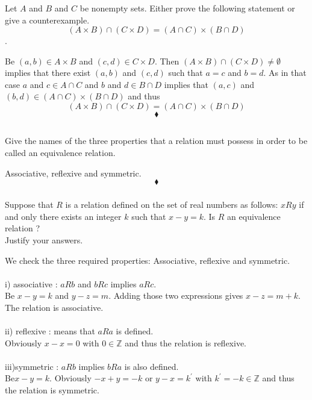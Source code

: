 \subsubsection{}
\begin{tcolorbox}
Let $A$ and $B$ and $C$ be nonempty sets. Either prove the following statement or give a counterexample. $$(A\times  B) \cap (C\times D) = (A\cap C) \times (B \cap D)$$.
\end{tcolorbox}
$$ $$
Be $(a,b)\in A\times B$ and $(c,d)\in C\times D$. Then $(A\times  B) \cap (C\times D)\neq \emptyset$ implies that there exist $(a,b)$ and $(c,d)$ such that $a=c$ and $b=d$. As in that case $a$ and $c\in A\cap C$ and  $b$ and $d\in B\cap D$ implies that $(a,c)$ and $(b,d) \in (A\cap C) \times (B \cap D)$ and thus 
$$(A\times  B) \cap (C\times D) = (A\cap C) \times (B \cap D)$$
$$\blacklozenge$$


\renewcommand{\thesubsection}{\thesection.\RomanNumeralCaps{3}}
\subsection{}
\subsubsection{}
\begin{tcolorbox}
Give the names of the three properties that a relation must possess in order to be called an equivalence relation.
\end{tcolorbox}
$$ $$
Associative, reflexive and symmetric.
$$\blacklozenge$$

\subsubsection{}
\begin{tcolorbox}
Suppose that $R$ is a relation defined on the set of real numbers  as follows: $xRy$ if and only there exists an integer $k$ such that $x-y=k$. Is $R$ an equivalence relation ?\\
Justify your answers.
\end{tcolorbox}
$$ $$
We check the three required properties: Associative, reflexive and symmetric.\\\\
i) associative : $aRb$ and $bRc$ implies $aRc$.\\
Be $x-y=k$ and $y-z=m$. Adding those two expressions gives $x-z=m+k$.\\
The relation is associative.\\\\
ii) reflexive  : means that $aRa$ is defined.\\
Obviously $x-x=0$ with $0\in \mathbb{Z}$ and thus the relation is reflexive.\\\\
iii)symmetric   : $aRb$  implies $bRa$ is also defined.\\
Be$x-y=k$. Obviously $-x+y=-k$ or $y-x=k^{'}$ with $k^{'}=-k \in \mathbb{Z}$ and thus the relation is symmetric.

